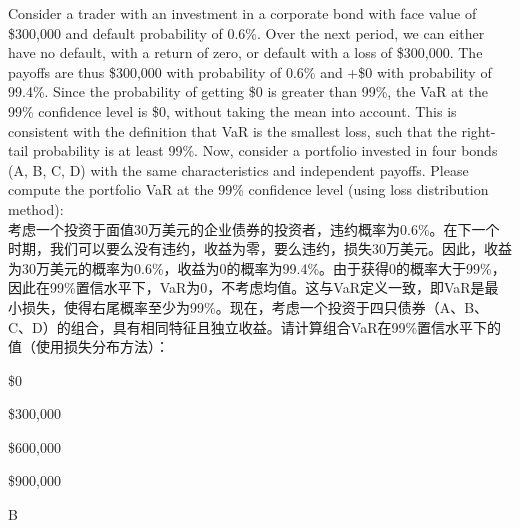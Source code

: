 \documentclass{article}
\newcounter{question} %
\begin{document}
\begin{question}
    Consider a trader with an investment in a corporate bond with face value of \$300,000 and default probability of 0.6\%. Over the next period, we can either have no default, with a return of zero, or default with a loss of \$300,000. The payoffs are thus \$300,000 with probability of 0.6\% and +\$0 with probability of 99.4\%. Since the probability of getting \$0 is greater than 99\%, the VaR at the 99\% confidence level is \$0, without taking the mean into account. This is consistent with the definition that VaR is the smallest loss, such that the right-tail probability is at least 99\%. Now, consider a portfolio invested in four bonds (A, B, C, D) with the same characteristics and independent payoffs. Please compute the portfolio VaR at the 99\% confidence level (using loss distribution method):
    \\考虑一个投资于面值30万美元的企业债券的投资者，违约概率为0.6\%。在下一个时期，我们可以要么没有违约，收益为零，要么违约，损失30万美元。因此，收益为30万美元的概率为0.6\%，收益为0的概率为99.4\%。由于获得0的概率大于99\%，因此在99\%置信水平下，VaR为0，不考虑均值。这与VaR定义一致，即VaR是最小损失，使得右尾概率至少为99\%。现在，考虑一个投资于四只债券（A、B、C、D）的组合，具有相同特征且独立收益。请计算组合VaR在99\%置信水平下的值（使用损失分布方法）：
\end{question}

\begin{choices}
    \item \$0
    \item \$300,000
    \item \$600,000
    \item \$900,000
\end{choices}

\begin{correctanswer}
    B
\end{correctanswer}
\end{document}
